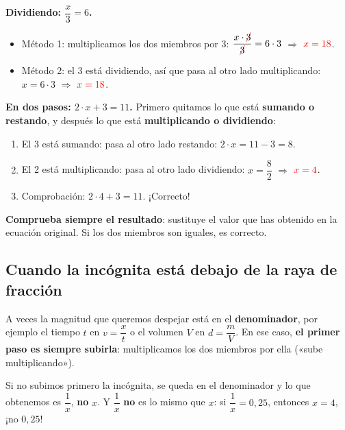 \begin{example}
    \textbf{Dividiendo: \(\dfrac{x}{3} = 6\).}
    \begin{itemize}
        \item Método 1: multiplicamos los dos miembros por 3: \(\dfrac{x \cdot \cancelred{3}}{\cancelred{3}} = 6 \cdot 3\) \(\Rightarrow\) \(\textcolor{red}{x = 18}\).
        \item Método 2: el 3 está dividiendo, así que pasa al otro lado multiplicando: \(x = 6 \cdot 3\) \(\Rightarrow\) \(\textcolor{red}{x = 18}\).
    \end{itemize}
\end{example}

\begin{example}
    \textbf{En dos pasos: \(2 \cdot x + 3 = 11\).} Primero quitamos lo que está \textbf{sumando o restando}, y después lo que está \textbf{multiplicando o dividiendo}:
    \begin{enumerate}[label=\numberballmDarkTeal]
        \item El 3 está sumando: pasa al otro lado restando: \(2 \cdot x = 11 - 3 = 8\).
        \item El 2 está multiplicando: pasa al otro lado dividiendo: \(x = \dfrac{8}{2}\) \(\Rightarrow\) \(\textcolor{red}{x = 4}\).
        \item Comprobación: \(2 \cdot 4 + 3 = 11\). \textcolor{green!50!black}{¡Correcto!}
    \end{enumerate}
\end{example}

\begin{marker}
    \textbf{Comprueba siempre el resultado}: sustituye el valor que has obtenido en la ecuación original. Si los dos miembros son iguales, es correcto.
\end{marker}

\subsection{Cuando la incógnita está debajo de la raya de fracción}

A veces la magnitud que queremos despejar está en el \textbf{denominador}, por ejemplo el tiempo \(t\) en \(v = \dfrac{x}{t}\) o el volumen \(V\) en \(d = \dfrac{m}{V}\). En ese caso, \textbf{el primer paso es siempre subirla}: multiplicamos los dos miembros por ella («sube multiplicando»).

\begin{impt}
    Si no subimos primero la incógnita, se queda en el denominador y lo que obtenemos es \(\dfrac{1}{x}\), \textbf{no} \(x\). Y \(\dfrac{1}{x}\) \textbf{no} es lo mismo que \(x\): si \(\dfrac{1}{x} = 0{,}25\), entonces \(x = 4\), ¡no \(0{,}25\)!
\end{impt}

